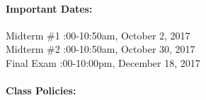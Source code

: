 \documentclass[11pt, a4paper]{article}
\begin{document}
\paragraph{Important Dates:}
\begin{center} \begin{minipage}{3.8in}
\begin{flushleft}
Midterm \#1      :00-10:50am, October 2, 2017  \\
Midterm \#2      :00-10:50am, October 30, 2017\\
Final Exam       :00-10:00pm, December 18, 2017\\
\end{flushleft}
\end{minipage}
\end{center}

\paragraph{Class Policies:}  
\end{document}
